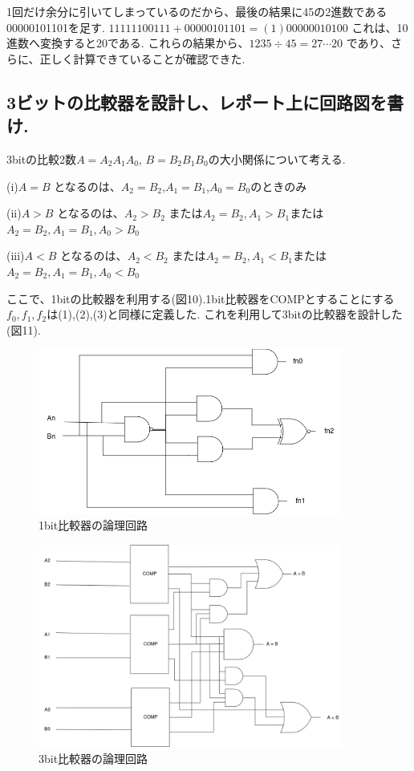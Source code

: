 \documentclass[titlepage]{jsarticle}
\theoremstyle{definition}
\begin{document}
1回だけ余分に引いてしまっているのだから、最後の結果に45の2進数である00000101101を足す.
$11111100111 + 00000101101 = (1)00000010100$
これは、10進数へ変換すると20である.
これらの結果から、$1235 \div 45 = 27 \cdots 20$ であり、さらに、正しく計算できていることが確認できた.

\subsection{3ビットの比較器を設計し、レポート上に回路図を書け.}
3bitの比較2数$A = A_2 A_1 A_0$, $B = B_2 B_1 B_0$の大小関係について考える.

(i)$A = B$ となるのは、$A_2 = B_2$,$A_1 = B_1$,$A_0 = B_0$のときのみ

(ii)$A > B$ となるのは、$A_2 > B_2$ または$A_2 = B_2, A_1 > B_1$または$A_2 = B_2, A_1 = B_1, A_0 > B_0$

(iii)$A < B$ となるのは、$A_2 < B_2$ または$A_2 = B_2, A_1 < B_1$または$A_2 = B_2, A_1 = B_1, A_0 < B_0$


ここで、1bitの比較器を利用する(図10).1bit比較器をCOMPとすることにする$f_0, f_1, f_2$は(1),(2),(3)と同様に定義した.
これを利用して3bitの比較器を設計した(図11).


\begin{figure}[htbp]
	\begin{center}
		\includegraphics[width=100mm]{1bitcomp.png}
		\caption{1bit比較器の論理回路}
	\end{center}
\end{figure}


\begin{figure}[htbp]
	\begin{center}
		\includegraphics[width=100mm]{3bitcomp.png}
		\caption{3bit比較器の論理回路}
	\end{center}
\end{figure}
\end{document}

